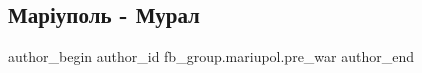  
 
 
 
 

\subsection{Маріуполь - Мурал}
\label{sec:07_02_2023.fb.fb_group.mariupol.pre_war.1.mar_upol___mural}

\ifcmt
 author_begin
   author_id fb_group.mariupol.pre_war
 author_end
\fi
